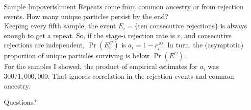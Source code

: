 \documentclass[12pt,a4paper,t,xcolor=dvipsnames,slidestop,compress,mathserif]{beamer}
\begin{document}
\begin{frame}{Sample Impoverishment}
Repeats come from common ancestry or from rejection events.
\pause
How many unique particles persist by the end?\\
\pause
\phantom{0}
Keeping every fifth sample, the event $E_i = \{\text{ten consecutive}$ $\text{rejections}\}$ is always enough to get a repeat.
\pause
So, if the stage-$i$ rejection rate is $r$, and consecutive rejections are independent, $\Pr(E_i^C)$ is $a_i=1 - r_i^{10}$. In turn, the (asymptotic) proportion of unique particles surviving is below $\Pr(E^C)$.\\
\pause
\phantom{0}
For the samples I showed, the product of empirical estimates for $a_i$ was $300/1,000,000$.
\pause
That ignores correlation in the rejection events and common ancestry.
\end{frame}

\begin{frame}[allowframebreaks]{Questions?}


\begin{center}

\end{center}
\end{frame}
\end{document}
